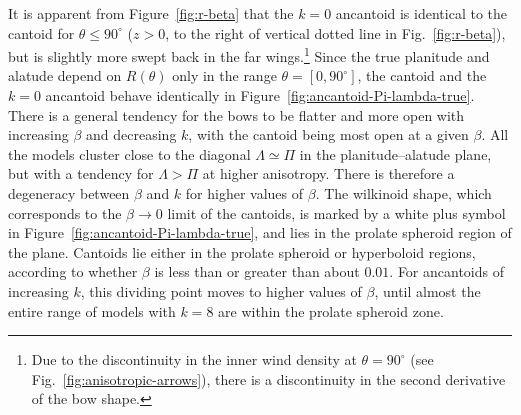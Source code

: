 It is apparent from Figure~\ref{fig:r-beta} that the \(k=0\) ancantoid
is identical to the cantoid for \(\theta \le 90^\circ\) (\(z > 0\), to the right
of vertical dotted line in Fig.~\ref{fig:r-beta}), but is slightly
more swept back in the far wings.\footnote{%
  Due to the discontinuity in the inner wind density at
  \(\theta = 90^\circ\) (see Fig.~\ref{fig:anisotropic-arrows}), there is a
  discontinuity in the second derivative of the bow shape.} %
Since the true planitude and alatude depend on \(R(\theta)\) only in the
range \(\theta = [0, 90^\circ]\), the cantoid and the \(k = 0\) ancantoid
behave identically in Figure~\ref{fig:ancantoid-Pi-lambda-true}.
There is a general tendency for the bows to be flatter and more open
with increasing \(\beta\) and decreasing \(k\), with the cantoid being
most open at a given \(\beta\).  All the models cluster close to the
diagonal \(\Lambda \simeq \Pi\) in the planitude--alatude plane, but with a tendency
for \(\Lambda > \Pi\) at higher anisotropy.  There is therefore a degeneracy
between \(\beta\) and \(k\) for higher values of \(\beta\).  The wilkinoid
shape, which corresponds to the \(\beta \to 0\) limit of the cantoids, is
marked by a white plus symbol in
Figure~\ref{fig:ancantoid-Pi-lambda-true}, and lies in the prolate
spheroid region of the plane.  Cantoids lie either in the prolate
spheroid or hyperboloid regions, according to whether \(\beta\) is less
than or greater than about \(0.01\).  For ancantoids of increasing
\(k\), this dividing point moves to higher values of \(\beta\), until
almost the entire range of models with \(k = 8\) are within the
prolate spheroid zone.

